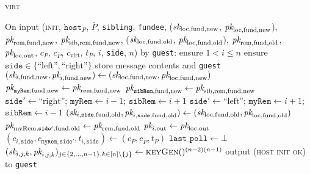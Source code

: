 \begin{center}
\begin{processbox}{\textsc{virt}}
\begin{algorithmic}[1]
      \State {}
      \State On input (\textsc{init}, $\texttt{host}_P$, $\bar{P}$,
      \texttt{sibling}, \texttt{fundee}, ($\textit{sk}_{\mathrm{loc}, \mathrm{fund},
      \mathrm{new}}$, $\textit{pk}_{\mathrm{loc}, \mathrm{fund}, \mathrm{new}}$),
      $\textit{pk}_{\mathrm{rem}, \mathrm{fund}, \mathrm{new}}$, $\textit{pk}_{\mathrm{sib},
      \mathrm{rem}, \mathrm{fund}, \mathrm{new}}$, ($\textit{sk}_{\mathrm{loc},
      \mathrm{fund}, \mathrm{old}}$, $\textit{pk}_{\mathrm{loc}, \mathrm{fund},
      \mathrm{old}}$), $\textit{pk}_{\mathrm{rem}, \mathrm{fund}, \mathrm{old}}$,
      $\textit{pk}_{\mathrm{loc}, \mathrm{out}}$, $c_P$, $c_{\bar{P}}$,
      $c_{\mathrm{virt}}$, $t_P$, $i$, \texttt{side}, $n$) by \texttt{guest}:
      \label{code:virtual-layer:keys:init}
      \Indent
        \State ensure $1 < i \leq n$ 
        \label{code:virtual-layer:keys:init:check-i}
        \State ensure $\texttt{side} \in \{\text{``left''},
        \text{``right''}\}$
        \State store message contents and \texttt{guest}
        \State $(\textit{sk}_{i, \mathrm{fund}, \mathrm{new}}, \textit{pk}_{i, \mathrm{fund},
        \mathrm{new}}) \gets (\textit{sk}_{\mathrm{loc}, \mathrm{fund}, \mathrm{new}},
        \textit{pk}_{\mathrm{loc}, \mathrm{fund}, \mathrm{new}})$
        \State $\textit{pk}_{\texttt{myRem}, \mathrm{fund}, \mathrm{new}} \gets
        \textit{pk}_{\mathrm{rem}, \mathrm{fund}, \mathrm{new}}$
         
          \State $\textit{pk}_{\texttt{sibRem}, \mathrm{fund}, \mathrm{new}} \gets
          \textit{pk}_{\mathrm{sib}, \mathrm{rem}, \mathrm{fund}, \mathrm{new}}$
        \EndIf
          \State $\texttt{side}' \gets \text{``right''}$; $\texttt{myRem}
          \gets i-1$; $\texttt{sibRem} \gets i+1$
        \Else \: 
          \State $\texttt{side}' \gets \text{``left''}$; $\texttt{myRem} \gets
          i+1$; $\texttt{sibRem} \gets i-1$
        \EndIf
        \State $(\textit{sk}_{i, \texttt{side}, \mathrm{fund}, \mathrm{old}}, \textit{pk}_{i,
        \texttt{side}, \mathrm{fund}, \mathrm{old}}) \gets (\textit{sk}_{\mathrm{loc},
        \mathrm{fund}, \mathrm{old}}, \textit{pk}_{\mathrm{loc}, \mathrm{fund},
        \mathrm{old}})$
        \State $\textit{pk}_{\mathrm{myRem}, \texttt{side}', \mathrm{fund}, \mathrm{old}}
        \gets \textit{pk}_{\mathrm{rem}, \mathrm{fund}, \mathrm{old}}$
        \State $\textit{pk}_{i, \mathrm{out}} \gets \textit{pk}_{\mathrm{loc}, \mathrm{out}}$
        \State $(c_{i, \texttt{side}}, c_{\texttt{myRem}, \texttt{side}'}, t_{i,
        \texttt{side}}) \gets (c_P, c_{\bar{P}}, t_P)$
        \State $\texttt{last\_poll} \gets \bot$
          \State $(\textit{sk}_{i, j, k}, \textit{pk}_{i, j, k})_{j \in \{2, \dots, n-1\}, k \in
          [n] \setminus \{j\}} \gets \textsc{keyGen}()^{(n-2)(n-1)}$
        \EndIf
        \State output (\textsc{host init ok}) to \texttt{guest}
      \EndIndent
      \Statex


\end{algorithmic}
\end{processbox}
\end{center}
